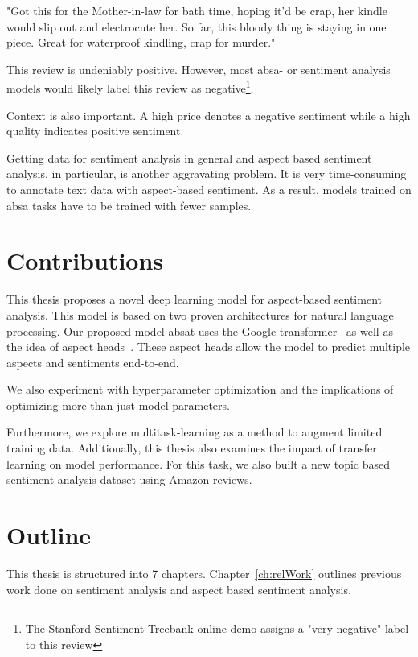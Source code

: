 \begin{center}
    "Got this for the Mother-in-law for bath time, hoping it'd be crap, her kindle would slip out and electrocute her. So far, this bloody thing is staying in one piece. Great for waterproof kindling, crap for murder."
\end{center}

This review is undeniably positive. However, most \gls{absa}- or sentiment analysis models would likely label this review as negative\footnote{The Stanford Sentiment Treebank online demo assigns a "very negative" label to this review}.

Context is also important. A high price denotes a negative sentiment while a high quality indicates positive sentiment.
\medskip

Getting data for sentiment analysis in general and aspect based sentiment analysis, in particular, is another aggravating problem. It is very time-consuming to annotate text data with aspect-based sentiment. As a result, models trained on \gls{absa} tasks have to be trained with fewer samples.

\section{Contributions}

This thesis proposes a novel deep learning model for aspect-based sentiment analysis. This model is based on two proven architectures for natural language processing. Our proposed model \acrfull{absat} uses the Google transformer~\cite{Vaswani2017d} as well as the idea of aspect heads~\cite{Schmitt2018}. These aspect heads allow the model to predict multiple aspects and sentiments end-to-end.
\medskip

We also experiment with hyperparameter optimization and the implications of optimizing more than just model parameters.

Furthermore, we explore multitask-learning as a method to augment limited training data. Additionally, this thesis also examines the impact of transfer learning on model performance. For this task, we also built a new topic based sentiment analysis dataset using Amazon reviews.

\section{Outline}

This thesis is structured into 7 chapters. Chapter~\ref{ch:relWork} outlines previous work done on sentiment analysis and aspect based sentiment analysis.
\smallskip

